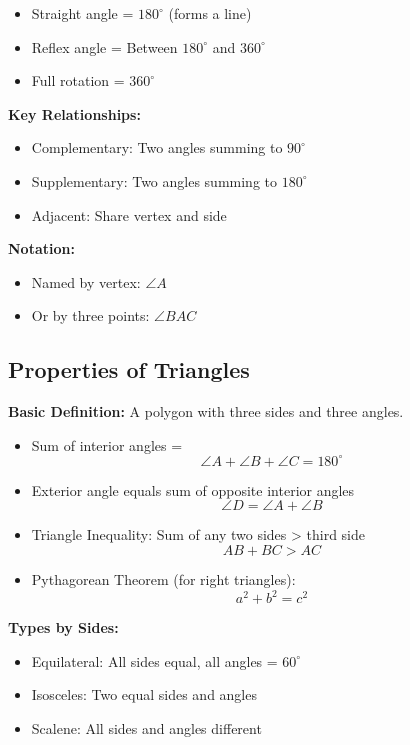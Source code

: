 \documentclass{article} %
\begin{document}
\begin{itemize}
    \item Straight angle = $180^\circ$ (forms a line)
    \item Reflex angle = Between $180^\circ$ and $360^\circ$
    \item Full rotation = $360^\circ$
\end{itemize}

\textbf{Key Relationships:}
\begin{itemize}
    \item Complementary: Two angles summing to $90^\circ$
    \item Supplementary: Two angles summing to $180^\circ$
    \item Adjacent: Share vertex and side
\end{itemize}

\textbf{Notation:}
\begin{itemize}
    \item Named by vertex: $\angle A$
    \item Or by three points: $\angle BAC$
\end{itemize}
\subsection{Properties of Triangles}

\textbf{Basic Definition:}
A polygon with three sides and three angles.

\begin{itemize}
    \item Sum of interior angles = 
    \[
    \angle A + \angle B + \angle C = 180^\circ
    \]
    \item Exterior angle equals sum of opposite interior angles
    \[
    \angle D = \angle A + \angle B
    \]
\end{itemize}

\begin{itemize}
    \item Triangle Inequality: Sum of any two sides > third side
    \[
    AB + BC > AC
    \]
    \item Pythagorean Theorem (for right triangles):
    \[
    a^2 + b^2 = c^2
    \]
\end{itemize}

\textbf{Types by Sides:}
\begin{itemize}
    \item Equilateral: All sides equal, all angles = $60^\circ$
    \item Isosceles: Two equal sides and angles
    \item Scalene: All sides and angles different
\end{itemize}
\end{document}
